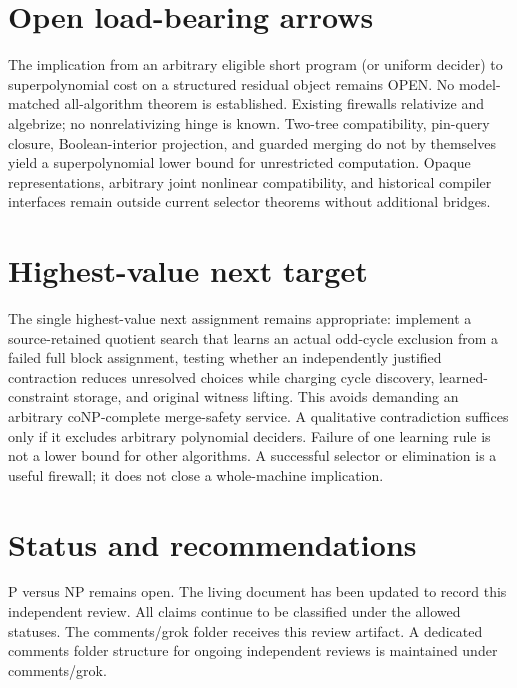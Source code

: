 \documentclass[11pt]{article}
\begin{document}
\section{Open load-bearing arrows}
The implication from an arbitrary eligible short program (or uniform decider) to superpolynomial cost on a structured residual object remains OPEN. No model-matched all-algorithm theorem is established. Existing firewalls relativize and algebrize; no nonrelativizing hinge is known. Two-tree compatibility, pin-query closure, Boolean-interior projection, and guarded merging do not by themselves yield a superpolynomial lower bound for unrestricted computation. Opaque representations, arbitrary joint nonlinear compatibility, and historical compiler interfaces remain outside current selector theorems without additional bridges.

\section{Highest-value next target}
The single highest-value next assignment remains appropriate: implement a source-retained quotient search that learns an actual odd-cycle exclusion from a failed full block assignment, testing whether an independently justified contraction reduces unresolved choices while charging cycle discovery, learned-constraint storage, and original witness lifting. This avoids demanding an arbitrary coNP-complete merge-safety service. A qualitative contradiction suffices only if it excludes arbitrary polynomial deciders. Failure of one learning rule is not a lower bound for other algorithms. A successful selector or elimination is a useful firewall; it does not close a whole-machine implication.

\section{Status and recommendations}
P versus NP remains open. The living document has been updated to record this independent review. All claims continue to be classified under the allowed statuses. The comments/grok folder receives this review artifact. A dedicated comments folder structure for ongoing independent reviews is maintained under comments/grok.

\end{document}
